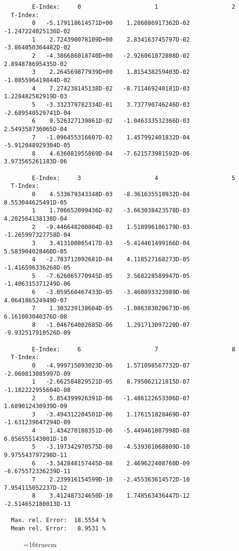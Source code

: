 \documentclass[12pt,dvipdfmx]{article}
\begin{document}
\begin{small}\begin{verbatim}
        E-Index:     0                     1                     2
  T-Index:
        0   -5.179118614571D+00    1.286086917362D-02   -1.247224025136D-02
        1    2.724390078109D+00    2.834163745797D-02   -3.864050364482D-02
        2   -4.386686018740D+00   -2.926061072808D-02    2.894878695435D-02
        3    2.264569877939D+00    1.815438259403D-02   -1.085596419844D-02
        4    7.274238145138D-02   -8.711469240181D-03    1.228482582919D-03
        5   -3.332379782334D-01    3.737790746246D-03   -2.689540529741D-04
        6    9.526327139861D-02   -1.046333532366D-03    2.549358736065D-04
        7   -1.096455316607D-02    1.457992401832D-04   -5.912048929304D-05
        8    4.636081955869D-04   -7.621573981592D-06    3.973565261183D-06

        E-Index:     3                     4                     5
  T-Index:
        0    4.533679343348D-03   -8.361635510932D-04    8.553044625491D-05
        1    1.706652099436D-02   -3.663038423578D-03    4.202564138138D-04
        2   -9.446648200804D-03    1.518996106179D-03   -1.265997327758D-04
        3    3.413100865417D-03   -5.414461499166D-04    5.583904028460D-05
        4   -2.783712092681D-04    4.118527168273D-05   -1.416596336268D-05
        5   -7.626065770945D-05    3.568228589947D-05   -1.406315371249D-06
        6   -3.059560467433D-05   -3.460893323989D-06    4.064186524949D-07
        7    1.303239138604D-05   -1.086383020673D-06    6.161003040376D-08
        8   -1.046764002685D-06    1.291713097220D-07   -9.932517910526D-09

        E-Index:     6                     7                     8
  T-Index:
        0   -4.999715093023D-06    1.571098567732D-07   -2.060813085997D-09
        1   -2.662584829521D-05    8.795062121815D-07   -1.182222955604D-08
        2    5.854399926391D-06   -1.486122653306D-07    1.689012430939D-09
        3   -3.494312204501D-06    1.176151828469D-07   -1.631239647294D-09
        4    1.434270108351D-06   -5.449461807998D-08    6.856555143001D-10
        5   -3.197342970575D-08   -4.539301068809D-10    9.975543797298D-11
        6   -3.342848157445D-08    2.469622408760D-09   -6.675572336239D-11
        7    2.239916154599D-10   -2.455363614572D-10    7.954115052237D-12
        8    3.412487324650D-10    1.748563436447D-12   -2.514652180013D-13

  Max. rel. Error:  18.5554 %
  Mean rel. Error:   8.9531 %

\end{verbatim}\end{small}
\begin{figure} \label{2.0c}
\epsfxsize=16truecm
\end{figure}
\newpage
\end{document}
